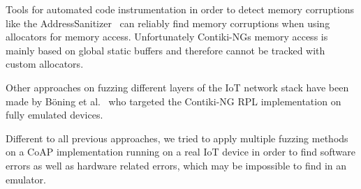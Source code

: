 Tools for automated code instrumentation in order to detect memory corruptions like the AddressSanitizer~\cite{addressSanitizer} can reliably find memory corruptions when using allocators for memory access. Unfortunately Contiki-NGs memory access is mainly based on global static buffers and therefore cannot be tracked with custom allocators.

Other approaches on fuzzing different layers of the IoT network stack have been made by Böning et al.~\cite{PawelLeo} who targeted the Contiki-NG RPL implementation on fully emulated devices.

Different to all previous approaches, we tried to apply multiple fuzzing methods on a CoAP implementation running on a real IoT device in order to find software errors as well as hardware related errors, which may be impossible to find in an emulator.
